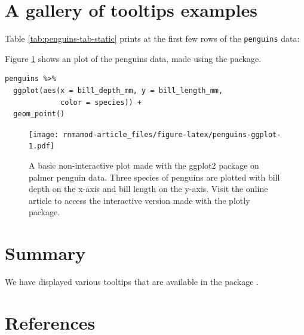 \hypertarget{a-gallery-of-tooltips-examples}{%
\section{A gallery of tooltips examples}\label{a-gallery-of-tooltips-examples}}

Table \ref{tab:penguins-tab-static} prints at the first few rows of the \texttt{penguins} data:

Figure \ref{fig:penguins-ggplot} shows an plot of the penguins data, made using the  package.

\begin{verbatim}
penguins %>% 
  ggplot(aes(x = bill_depth_mm, y = bill_length_mm, 
             color = species)) + 
  geom_point()
\end{verbatim}

\begin{figure}
\centering
\texttt{[image: rnmamod-article\_files/figure-latex/penguins-ggplot-1.pdf]}
\caption{\label{fig:penguins-ggplot}A basic non-interactive plot made with the ggplot2 package on palmer penguin data. Three species of penguins are plotted with bill depth on the x-axis and bill length on the y-axis. Visit the online article to access the interactive version made with the plotly package.}
\end{figure}

\hypertarget{summary}{%
\section{Summary}\label{summary}}

We have displayed various tooltips that are available in the package .

\hypertarget{references}{%
\section*{References}\label{references}}

